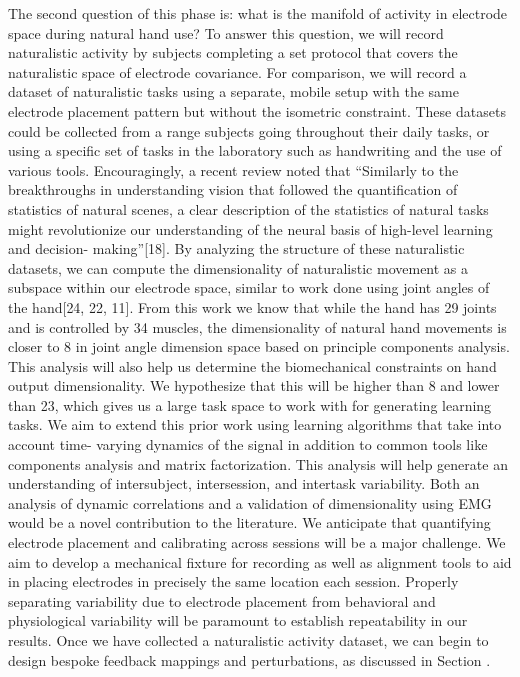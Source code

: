 \documentclass[
  a4paper,
]{article}
\begin{document}
The second question of this phase is: what is the manifold of activity
in electrode space during natural hand use? To answer this question, we
will record naturalistic activity by subjects completing a set protocol
that covers the naturalistic space of electrode covariance. For
comparison, we will record a dataset of naturalistic tasks using a
separate, mobile setup with the same electrode placement pattern but
without the isometric constraint. These datasets could be collected from
a range subjects going throughout their daily tasks, or using a specific
set of tasks in the laboratory such as handwriting and the use of
various tools. Encouragingly, a recent review noted that ``Similarly to
the breakthroughs in understanding vision that followed the
quantification of statistics of natural scenes, a clear description of
the statistics of natural tasks might revolutionize our understanding of
the neural basis of high-level learning and decision- making''{[}18{]}.
By analyzing the structure of these naturalistic datasets, we can
compute the dimensionality of naturalistic movement as a subspace within
our electrode space, similar to work done using joint angles of the
hand{[}24, 22, 11{]}. From this work we know that while the hand has 29
joints and is controlled by 34 muscles, the dimensionality of natural
hand movements is closer to 8 in joint angle dimension space based on
principle components analysis. This analysis will also help us determine
the biomechanical constraints on hand output dimensionality. We
hypothesize that this will be higher than 8 and lower than 23, which
gives us a large task space to work with for generating learning tasks.
We aim to extend this prior work using learning algorithms that take
into account time- varying dynamics of the signal in addition to common
tools like components analysis and matrix factorization. This analysis
will help generate an understanding of intersubject, intersession, and
intertask variability. Both an analysis of dynamic correlations and a
validation of dimensionality using EMG would be a novel contribution to
the literature. We anticipate that quantifying electrode placement and
calibrating across sessions will be a major challenge. We aim to develop
a mechanical fixture for recording as well as alignment tools to aid in
placing electrodes in precisely the same location each session. Properly
separating variability due to electrode placement from behavioral and
physiological variability will be paramount to establish repeatability
in our results. Once we have collected a naturalistic activity dataset,
we can begin to design bespoke feedback mappings and perturbations, as
discussed in Section .
\end{document}
